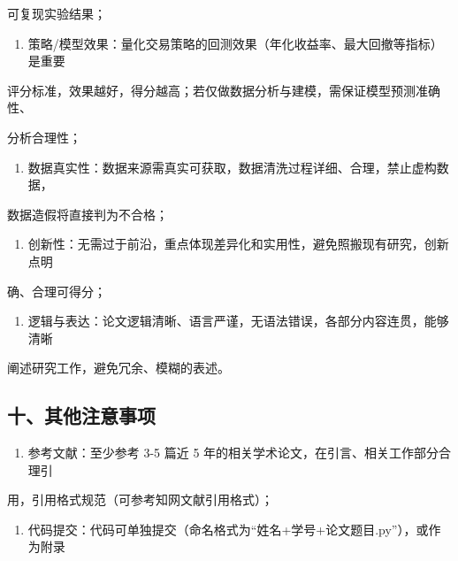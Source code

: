 \documentclass[
]{article}
\providecommand{\tightlist}{%
  \setlength{\itemsep}{0pt}\setlength{\parskip}{0pt}}
\begin{document}
可复现实验结果；

\begin{enumerate}
\def\labelenumi{\arabic{enumi}.}
\setcounter{enumi}{3}
\tightlist
\item
  策略/模型效果：量化交易策略的回测效果（年化收益率、最大回撤等指标）是重要
\end{enumerate}

评分标准，效果越好，得分越高；若仅做数据分析与建模，需保证模型预测准确性、

分析合理性；

\begin{enumerate}
\def\labelenumi{\arabic{enumi}.}
\setcounter{enumi}{4}
\tightlist
\item
  数据真实性：数据来源需真实可获取，数据清洗过程详细、合理，禁止虚构数据，
\end{enumerate}

数据造假将直接判为不合格；

\begin{enumerate}
\def\labelenumi{\arabic{enumi}.}
\setcounter{enumi}{5}
\tightlist
\item
  创新性：无需过于前沿，重点体现差异化和实用性，避免照搬现有研究，创新点明
\end{enumerate}

确、合理可得分；

\begin{enumerate}
\def\labelenumi{\arabic{enumi}.}
\setcounter{enumi}{6}
\tightlist
\item
  逻辑与表达：论文逻辑清晰、语言严谨，无语法错误，各部分内容连贯，能够清晰
\end{enumerate}

阐述研究工作，避免冗余、模糊的表述。

\hypertarget{ux5341ux5176ux4ed6ux6ce8ux610fux4e8bux9879}{%
\subsection{\texorpdfstring{\textbf{十、其他注意事项}}{十、其他注意事项}}\label{ux5341ux5176ux4ed6ux6ce8ux610fux4e8bux9879}}

\begin{enumerate}
\def\labelenumi{\arabic{enumi}.}
\tightlist
\item
  参考文献：至少参考 3-5 篇近 5
  年的相关学术论文，在引言、相关工作部分合理引
\end{enumerate}

用，引用格式规范（可参考知网文献引用格式）；

\begin{enumerate}
\def\labelenumi{\arabic{enumi}.}
\setcounter{enumi}{1}
\tightlist
\item
  代码提交：代码可单独提交（命名格式为``姓名+学号+论文题目.py''），或作为附录
\end{enumerate}
\end{document}

